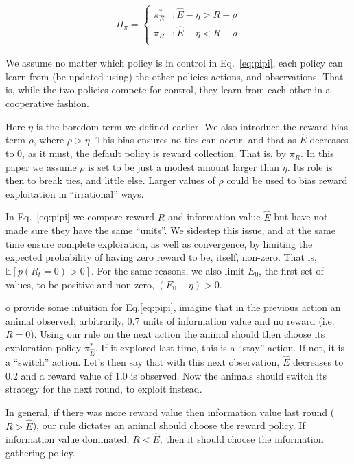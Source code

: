 \begin{equation} 
    \label{eq:pipi}
    \begin{split}
        \Pi_{\pi} = 
        \begin{cases}
            \pi^*_{\hat{E}} & : \hat{E} - \eta > R + \rho \\
            \pi_R 	& : \hat{E} - \eta < R + \rho \\
        \end{cases}
    \end{split}
\end{equation}

We assume no matter which policy is in control in Eq.~\ref{eq:pipi}, each policy can learn from (be updated using) the other policies actions, and observations. That is, while the two policies compete for control, they learn from each other in a cooperative fashion.

Here $\eta$ is the boredom term we defined earlier. We also introduce the reward bias term $\rho$, where $\rho > \eta$. This bias ensures no ties can occur, and that as $\hat E$ decreases to 0, as it must, the default policy is reward collection. That is, by $\pi_R$. In this paper we assume $\rho$ is set to be just a modest amount larger than $\eta$. Its role is then to break ties, and little else. Larger values of $\rho$ could be used to bias reward  exploitation in ``irrational'' ways.

In Eq.~\ref{eq:pipi} we compare reward $R$ and information value $\hat E$ but have not made sure they have the same ``units''. We sidestep this issue, and at the same time ensure complete exploration, as well as convergence, by limiting the expected probability of having zero reward to be, itself, non-zero. That is, $\mathbb{E}[p(R_t=0) > 0]$. For the same reasons, we also limit $E_0$, the first set of values, to be positive and non-zero, $(E_0 - \eta) > 0$. 

o provide some intuition for Eq.\ref{eq:pipi}, imagine that in the previous action an animal observed, arbitrarily, 0.7 units of information value and no reward (i.e. $R = 0$). Using our rule on the next action the animal should then choose its exploration policy $\pi^*_{\hat{E}}$. If it explored last time, this is a ``stay'' action. If not, it is a ``switch'' action. Let's then say that with this next observation, $\hat E$ decreases to 0.2 and a reward value of 1.0 is observed. Now the animals should switch its strategy for the next round, to exploit instead.

In general, if there was more reward value then information value last round ($R > \hat E$), our rule dictates an animal should choose the reward policy. If information value dominated, $R < \hat E$, then it should choose the information gathering policy.

